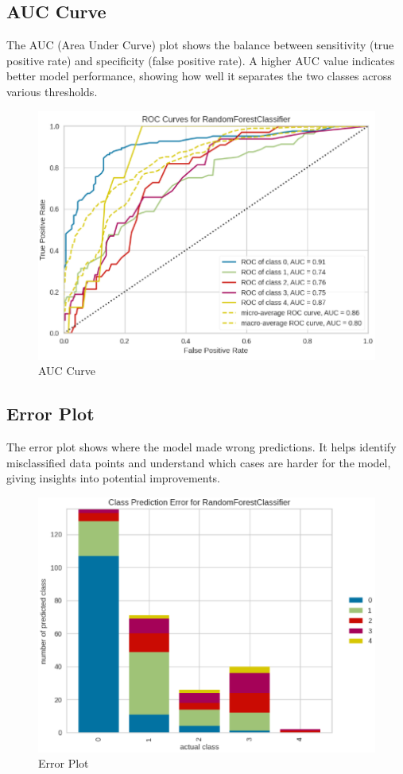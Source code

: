 \documentclass[journal]{IEEEtran}
\begin{document}
\subsection{AUC Curve}
The AUC (Area Under Curve) plot shows the balance between sensitivity (true positive rate) and specificity (false positive rate). A higher AUC value indicates better model performance, showing how well it separates the two classes across various thresholds.
\begin{figure}[h]
    \centering
    \includegraphics[width=1\linewidth]{images/ROC Curves & AUC Scores.png}
    \caption{AUC Curve}
    \label{fig:auc-curve}
\end{figure}

\subsection{Error Plot}
The error plot shows where the model made wrong predictions. It helps identify misclassified data points and understand which cases are harder for the model, giving insights into potential improvements.
\begin{figure}[h]
    \centering
    \includegraphics[width=1\linewidth]{images/Class Prediction Error.png}
    \caption{Error Plot}
    \label{fig:error-plot}
\end{figure}
\end{document}
